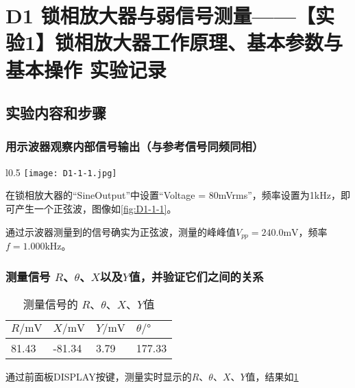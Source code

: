 \documentclass[dvipsnames, svgnames,a4paper,11pt]{article}
\begin{document}
\section{D1 \quad 锁相放大器与弱信号测量——【实验1】锁相放大器工作原理、基本参数与基本操作 \quad\heiti 实验记录}
\subsection{实验内容和步骤}

	\subsubsection{用示波器观察内部信号输出（与参考信号同频同相）}
	
	\begin{wrapfigure}{l}{0.5\textwidth}
		\centering
		\texttt{[image: D1-1-1.jpg]}
		\caption{用示波器观察内部信号输出}
		\label{fig:D1-1-1}
	\end{wrapfigure}

	在锁相放大器的“SineOutput”中设置“Voltage = 80mVrms”，频率设置为1kHz，即可产生一个正弦波，图像如\cref{fig:D1-1-1}。

	通过示波器测量到的信号确实为正弦波，测量的峰峰值$V_{pp} = 240.0 \text{mV}$，频率$f = 1.000 \text{kHz}$。




	\clearpage
	\subsubsection{测量信号 $R$、$\theta$、$X$以及$Y$值，并验证它们之间的关系}


	\begin{table}[htbp]
		\centering
		\begin{tabular}{|llll|} 
		\hline
		$R/\text{mV}$  & $X/\text{mV}$   & $Y/\text{mV}$ & $\theta/°$  \\ 
		\hline
		81.43 & -81.34 & 3.79 & 177.33   \\
		\hline
		\end{tabular}
		\caption{测量信号的 $R$、$\theta$、$X$、$Y$值}
		\label{tbl:D1-2-1}
	\end{table}

	通过前面板DISPLAY按键，测量实时显示的$R$、$\theta$、$X$、$Y$值，结果如\cref{tbl:D1-2-1}
\end{document}
